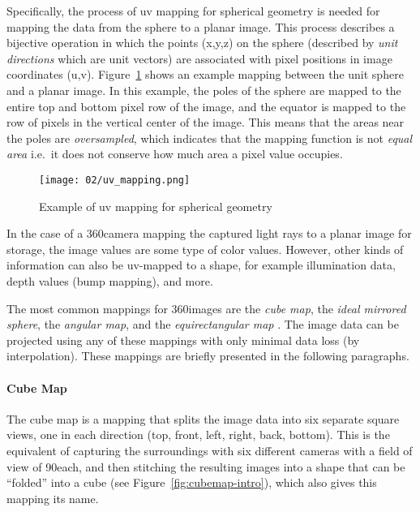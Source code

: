 Specifically, the process of uv mapping for spherical geometry is needed for mapping the data from the sphere to a planar image. This process describes a bijective operation in which the points (x,y,z) on the sphere (described by \emph{unit directions} which are unit vectors) are associated with pixel positions in image coordinates (u,v). Figure~\ref{fig:uv_mapping} shows an example mapping between the unit sphere and a planar image. In this example, the poles of the sphere are mapped to the entire top and bottom pixel row of the image, and the equator is mapped to the row of pixels in the vertical center of the image. This means that the areas near the poles are \emph{oversampled}, which indicates that the mapping function is not \emph{equal area} \cite[p.450]{hdrbook} i.e.\ it does not conserve how much area a pixel value occupies.

\begin{figure}
		\centering
		\texttt{[image: 02/uv\_mapping.png]}
		\caption[UV mapping example]{Example of uv mapping for spherical geometry}
		\label{fig:uv_mapping}
\end{figure}

In the case of a 360\degree camera mapping the captured light rays to a planar image for storage, the image values are some type of color values. However, other kinds of information can also be uv-mapped to a shape, for example illumination data, depth values (bump mapping), and more.

The most common mappings for 360\degree images are the \emph{cube map}, the \emph{ideal mirrored sphere}, the \emph{angular map},  and the \emph{equirectangular map} \cite[p. 535]{hdrbook}. The image data can be projected using any of these mappings with only minimal data loss (by interpolation). These mappings are briefly presented in the following paragraphs.

\paragraph{Cube Map}
The cube map is a mapping that splits the image data into six separate square views, one in each direction (top, front, left, right, back, bottom). This is the equivalent of capturing the surroundings with six different cameras with a field of view of 90\degree each, and then stitching the resulting images into a shape that can be ``folded'' into a cube (see Figure~\ref{fig:cubemap-intro}), which also gives this mapping its name.


